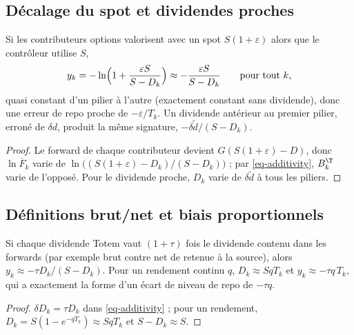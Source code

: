 \subsection{Décalage du spot et dividendes proches}
\begin{proposition}\label{prop-spot}
Si les contributeurs options valorisent avec un spot $S(1+\varepsilon)$ alors que le contrôleur utilise $S$,
\begin{equation}\label{eq-spot}
y_k=-\ln\Bigl(1+\frac{\varepsilon S}{S-D_k}\Bigr)\approx-\frac{\varepsilon S}{S-D_k}\qquad\text{pour tout }k,
\end{equation}
quasi constant d'un pilier à l'autre (exactement constant sans dividende), donc une erreur de repo proche de
$-\varepsilon/T_k$. Un dividende antérieur au premier pilier, erroné de $\delta d$, produit la même signature,
$-\delta\tilde d/(S-D_k)$.
\end{proposition}
\begin{proof}
Le forward de chaque contributeur devient $G(S(1+\varepsilon)-D)$, donc $\ln\overline{F}_k$ varie de
$\ln\bigl((S(1+\varepsilon)-D_k)/(S-D_k)\bigr)$ ; par \cref{eq-additivity}, $B^\T_k$ varie de l'opposé. Pour le
dividende proche, $D_k$ varie de $\delta\tilde d$ à tous les piliers.
\end{proof}

\subsection{Définitions brut/net et biais proportionnels}
\begin{proposition}\label{prop-gross}
Si chaque dividende Totem vaut $(1+\tau)$ fois le dividende contenu dans les forwards (par exemple brut contre net de
retenue à la source), alors $y_k\approx-\tau D_k/(S-D_k)$. Pour un rendement continu $q$, $D_k\approx SqT_k$ et
$y_k\approx-\tau q\,T_k$, qui a exactement la forme d'un écart de niveau de repo de $-\tau q$.
\end{proposition}
\begin{proof}
$\delta D_k=\tau D_k$ dans \cref{eq-additivity} ; pour un rendement, $D_k=S(1-e^{-qT_k})\approx SqT_k$ et $S-D_k\approx S$.
\end{proof}


